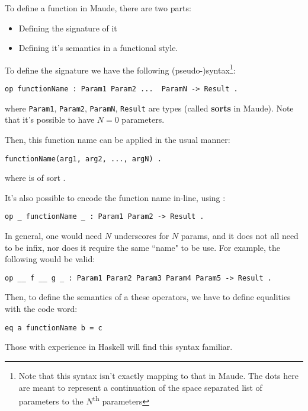 To define a function in Maude, there are two parts:
\begin{itemize}
    \item Defining the signature of it
    \item Defining it's semantics in a functional style.
\end{itemize}

To define the signature we have the following (pseudo-)syntax\footnote{Note that this syntax isn't exactly mapping to that in Maude. The dots here are meant to represent a continuation of the space separated list of parameters to the $N$\textsuperscript{th} parameters}:

\begin{verbatim}
op functionName : Param1 Param2 ...  ParamN -> Result .
\end{verbatim}

where \verb`Param1`, \verb`Param2`, \verb`ParamN`, \verb`Result` are types (called \textbf{sorts} in Maude). Note that it's possible to have $N = 0$ parameters.

Then, this function name can be applied in the usual manner:
\begin{verbatim}
functionName(arg1, arg2, ..., argN) .
\end{verbatim}

where  is of sort .

It's also possible to encode the function name in-line, using \code{\_}:

\begin{verbatim}
op _ functionName _ : Param1 Param2 -> Result .
\end{verbatim}

In general, one would need $N$ underscores for $N$ params, and it does not all need to be infix, nor does it require the same ``name" to be use. For example, the following would be valid:

\begin{verbatim}
op __ f __ g _ : Param1 Param2 Param3 Param4 Param5 -> Result .
\end{verbatim}

Then, to define the semantics of a these operators, we have to define equalities with the  code word:

\begin{verbatim}
eq a functionName b = c
\end{verbatim}

Those with experience in Haskell will find this syntax familiar.

